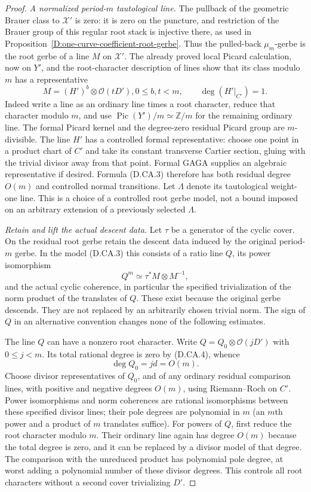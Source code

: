 \begin{proof}
\emph{A normalized period-$m$ tautological line.}
The pullback of the geometric Brauer class to $\mathcal X'$
is zero: it is zero on the puncture, and restriction of the
Brauer group of this regular root stack is injective there,
as used in Proposition~\ref{D:one-curve-coefficient-root-gerbe}.
Thus the pulled-back $\mu_m$-gerbe is the root gerbe of
a line $M$ on $\mathcal X'$. The already proved local
Picard calculation, now on $Y'$, and the root-character
description of lines show that its class modulo $m$ has
a representative
\[
       M=(H')^b\otimes\mathcal O(tD'),
                   0\leq b,t<m,\qquad \deg(H'|_{C'})=1.
                                                               \tag{D.CA.3}
\]
Indeed write a line as an ordinary line times a root
character, reduce that character modulo $m$, and use
$\operatorname{Pic}(Y')/m\simeq\mathbb Z/m$ for the
remaining ordinary line. The formal Picard kernel and
the degree-zero residual Picard group are $m$-divisible.
The line $H'$ has a controlled formal representative:
choose one point in a product chart of $C'$ and take its
constant transverse Cartier section, gluing with the
trivial divisor away from that point. Formal GAGA supplies
an algebraic representative if desired. Formula (D.CA.3)
therefore has both residual degree $O(m)$ and controlled
normal transitions. Let $\Lambda$ denote its tautological
weight-one line. This is a choice of a controlled root
gerbe model, not a bound imposed on an arbitrary extension
of a previously selected $\Lambda$.

\emph{Retain and lift the actual descent data.}
Let $\tau$ be a generator of the cyclic cover. On the
residual root gerbe retain the descent data induced by
the original period-$m$ gerbe. In the model (D.CA.3) this
consists of a ratio line $Q$, its power isomorphism
\[
                 Q^m\simeq\tau^*M\otimes M^{-1},       \tag{D.CA.4}
\]
and the actual cyclic coherence, in particular the specified
trivialization of the norm product of the translates of $Q$.
These exist because the original gerbe descends. They are
not replaced by an arbitrarily chosen trivial norm.
The sign of $Q$ in an alternative convention changes none
of the following estimates.

The line $Q$ can have a nonzero root character. Write
$Q=Q_0\otimes\mathcal O(jD')$ with $0\leq j<m$.
Its total rational degree is zero by (D.CA.4), whence
\[
                        \deg Q_0=jd=O(m).               \tag{D.CA.5}
\]
Choose divisor representatives of $Q_0$, and of any
ordinary residual comparison lines, with positive and
negative degrees $O(m)$, using Riemann--Roch on $C'$.
Power isomorphisms and norm coherences are rational
isomorphisms between these specified divisor lines;
their pole degrees are polynomial in $m$ (an $m$th power
and a product of $m$ translates suffice). For powers of
$Q$, first reduce the root character modulo $m$. Their
ordinary line again has degree $O(m)$ because the total
degree is zero, and it can be replaced by a divisor model
of that degree. The comparison with the unreduced product
has polynomial pole degree, at worst adding a polynomial
number of these divisor degrees. This controls all root
characters without a second cover trivializing $D'$.


\end{proof}

